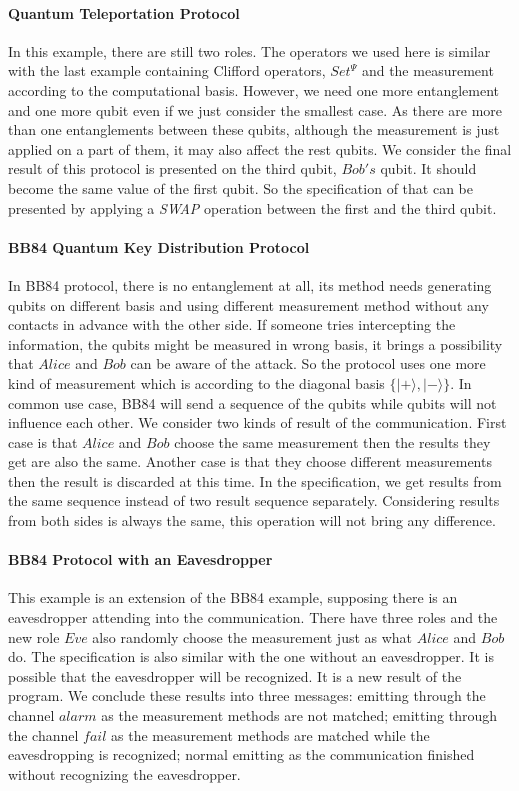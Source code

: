 \documentclass[a4paper,UKenglish,cleveref, autoref]{lipics-v2019}
\begin{document}
\paragraph*{Quantum Teleportation Protocol} In this example, there are still two roles. The operators we used here is similar with the last example containing Clifford operators, $Set^{\Psi}$ and the measurement according to the computational basis. However, we need one more entanglement and one more qubit even if we just consider the smallest case. As there are more than one entanglements between these qubits, although the measurement is just applied on a part of them, it may also affect the rest qubits. We consider the final result of this protocol is presented on the third qubit, $Bob's$ qubit. It should become the same value of the first qubit. So the specification of that can be presented by applying a \textit{SWAP} operation between the first and the third qubit.
\paragraph*{BB84 Quantum Key Distribution Protocol} In BB84 protocol, there is no entanglement at all, its method needs generating qubits on different basis and using different measurement method without any contacts in advance with the other side. If someone tries intercepting the information, the qubits might be measured in wrong basis, it brings a possibility that $Alice$ and $Bob$ can be aware of the attack. So the protocol uses one more kind of measurement which is according to the diagonal basis $\{|+\rangle,|-\rangle\}$. In common use case, BB84 will send a sequence of the qubits while qubits will not influence each other. We consider two kinds of result of the communication. First case is that $Alice$ and $Bob$ choose the same measurement then the results they get are also the same. Another case is that they choose different measurements then the result is discarded at this time. In the specification, we get results from the same sequence instead of two result sequence separately. Considering results from both sides is always the same, this operation will not bring any difference.
\paragraph*{BB84 Protocol with an Eavesdropper} This example is an extension of the BB84 example, supposing there is an eavesdropper attending into the communication. There have three roles and the new role $Eve$ also randomly choose the measurement just as what $Alice$ and $Bob$ do. The specification is also similar with the one without an eavesdropper. It is possible that the eavesdropper will be recognized. It is a new result of the program. We conclude these results into three messages: emitting through the channel $alarm$ as the measurement methods are not matched; emitting through the channel $fail$ as the measurement methods are matched while the eavesdropping is recognized; normal emitting as the communication finished without recognizing the eavesdropper.
\end{document}
